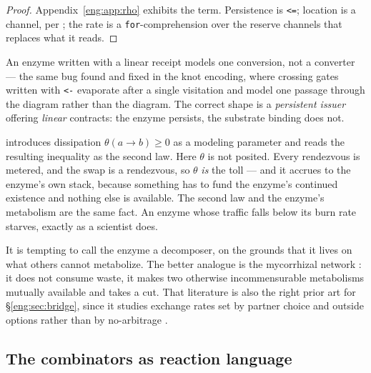 \begin{proof}
Appendix~\ref{eng:app:rho} exhibits the term. Persistence is \texttt{<=};
location is a channel, per \cite[\S2.2]{finrho}; the rate is a
\texttt{for}-comprehension over the reserve channels that replaces what it
reads.
\end{proof}

\begin{remark}\label{eng:persistence-load-bearing}
An enzyme written with a linear receipt models one conversion, not a
converter --- the same bug found and fixed in the knot encoding, where
crossing gates written with \texttt{<-} evaporate after a single
visitation and model one passage through the diagram rather than the
diagram. The correct shape is a \emph{persistent issuer} offering
\emph{linear} contracts: the enzyme persists, the substrate binding does
not.
\end{remark}

\begin{remark}\label{eng:rem:eats}
\cite[\S6]{vtok} introduces dissipation $\theta(a{\to}b) \geq 0$ as a
modeling parameter and reads the resulting inequality as the second law.
Here $\theta$ is not posited. Every rendezvous is metered, and the swap is
a rendezvous, so $\theta$ \emph{is} the toll --- and it accrues to the
enzyme's own stack, because something has to fund the enzyme's continued
existence and nothing else is available. The second law and the enzyme's
metabolism are the same fact. An enzyme whose traffic falls below its burn
rate starves, exactly as a scientist does.
\end{remark}

\begin{remark}\label{eng:decomposer}
It is tempting to call the enzyme a decomposer, on the grounds that it
lives on what others cannot metabolize. The better analogue is the
mycorrhizal network \cite{kiers}: it does not consume waste, it makes two
otherwise incommensurable metabolisms mutually available and takes a cut.
That literature is also the right prior art for
\S\ref{eng:sec:bridge}, since it studies exchange rates set by partner choice
and outside options rather than by no-arbitrage \cite{noe}.
\end{remark}

\subsection{The combinators as reaction language}\label{eng:S4.2}

